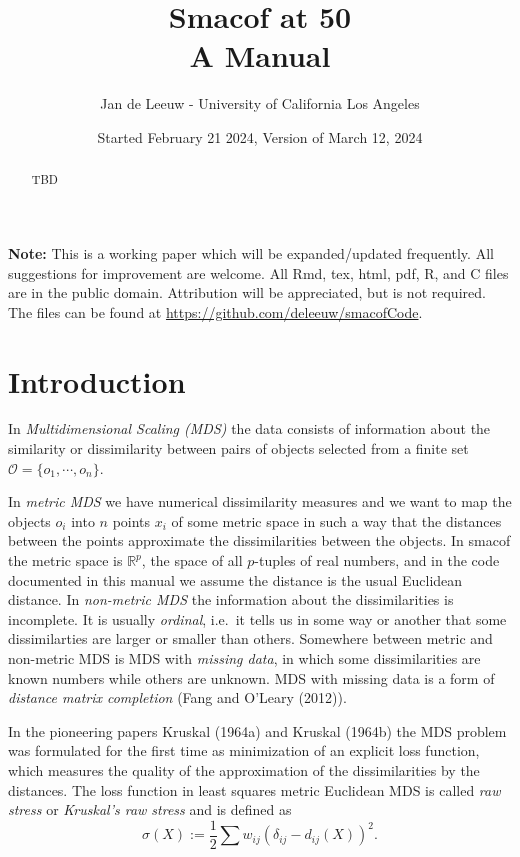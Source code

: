 \documentclass[
  12pt,
]{article}
\title{Smacof at 50\\
A Manual}
\author{Jan de Leeuw - University of California Los Angeles}
\date{Started February 21 2024, Version of March 12, 2024}
\begin{document}
\maketitle
\begin{abstract}
TBD
\end{abstract}

{
\setcounter{tocdepth}{4}
\tableofcontents
}
\textbf{Note:} This is a working paper which will be expanded/updated
frequently. All suggestions for improvement are welcome. All Rmd, tex,
html, pdf, R, and C files are in the public domain. Attribution will be
appreciated, but is not required. The files can be found at
\url{https://github.com/deleeuw/smacofCode}.

\section{Introduction}\label{introduction}

In \emph{Multidimensional Scaling (MDS)} the data consists of information about the similarity or dissimilarity between pairs of objects selected from a finite set \(\mathcal{O}=\{o_1,\cdots,o_n\}\).

In \emph{metric MDS} we have numerical dissimilarity measures and we want to map
the objects \(o_i\) into \(n\) points \(x_i\) of some metric space in such a way
that the distances between the points approximate the dissimilarities
between the objects. In smacof the metric space is \(\mathbb{R}^p\), the space of all \(p\)-tuples of real numbers, and in the code documented in this manual we assume
the distance is the usual Euclidean distance. In \emph{non-metric MDS} the information
about the dissimilarities is incomplete. It is usually \emph{ordinal}, i.e.~it tells
us in some way or another that some dissimilarties are larger or smaller than
others. Somewhere between metric and non-metric MDS is MDS with \emph{missing data},
in which some dissimilarities are known numbers while others are unknown. MDS with missing data is a form of \emph{distance matrix completion} (Fang and O'Leary (2012)).

In the pioneering papers Kruskal (1964a) and Kruskal (1964b) the MDS problem
was formulated for the first time as minimization of an explicit loss
function, which measures the quality of the approximation of the
dissimilarities by the distances. The loss function in least squares metric Euclidean MDS
is called \emph{raw stress} or \emph{Kruskal's raw stress} and is defined as
\begin{equation}
\sigma(X):=\frac12\sum w_{ij}(\delta_{ij}-d_{ij}(X))^2.
\label{eq:stressdef}
\end{equation}
\end{document}
